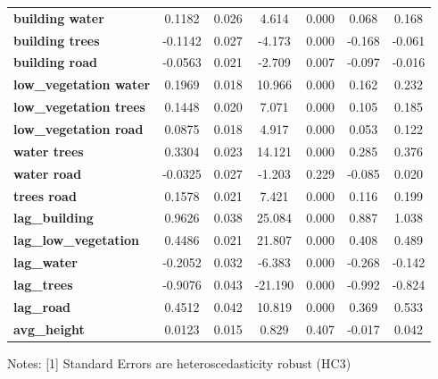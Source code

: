 \documentclass[12pt]{article}
\begin{document}
\begin{center}
\begin{tabular}{lcccccc}
\textbf{building water}          &       0.1182  &        0.026     &     4.614  &         0.000        &        0.068    &        0.168     \\
\textbf{building trees}          &      -0.1142  &        0.027     &    -4.173  &         0.000        &       -0.168    &       -0.061     \\
\textbf{building road}           &      -0.0563  &        0.021     &    -2.709  &         0.007        &       -0.097    &       -0.016     \\
\textbf{low\_vegetation water}   &       0.1969  &        0.018     &    10.966  &         0.000        &        0.162    &        0.232     \\
\textbf{low\_vegetation trees}   &       0.1448  &        0.020     &     7.071  &         0.000        &        0.105    &        0.185     \\
\textbf{low\_vegetation road}    &       0.0875  &        0.018     &     4.917  &         0.000        &        0.053    &        0.122     \\
\textbf{water trees}             &       0.3304  &        0.023     &    14.121  &         0.000        &        0.285    &        0.376     \\
\textbf{water road}              &      -0.0325  &        0.027     &    -1.203  &         0.229        &       -0.085    &        0.020     \\
\textbf{trees road}              &       0.1578  &        0.021     &     7.421  &         0.000        &        0.116    &        0.199     \\
\textbf{lag\_building}           &       0.9626  &        0.038     &    25.084  &         0.000        &        0.887    &        1.038     \\
\textbf{lag\_low\_vegetation}    &       0.4486  &        0.021     &    21.807  &         0.000        &        0.408    &        0.489     \\
\textbf{lag\_water}              &      -0.2052  &        0.032     &    -6.383  &         0.000        &       -0.268    &       -0.142     \\
\textbf{lag\_trees}              &      -0.9076  &        0.043     &   -21.190  &         0.000        &       -0.992    &       -0.824     \\
\textbf{lag\_road}               &       0.4512  &        0.042     &    10.819  &         0.000        &        0.369    &        0.533     \\
\textbf{avg\_height}             &       0.0123  &        0.015     &     0.829  &         0.407        &       -0.017    &        0.042     \\
\bottomrule
\end{tabular}
\end{center}
\vspace{-0.7cm}
\begin{center}
\begin{minipage}[H]{0.9\textwidth}
\scriptsize
Notes: [1] Standard Errors are heteroscedasticity robust (HC3)
\end{minipage}
\end{center}
\end{document}
